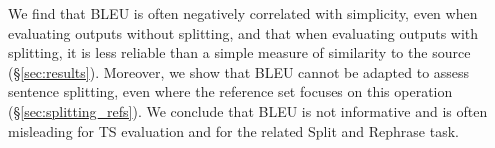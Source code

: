 \documentclass[11pt,a4paper]{article}
\begin{document}

We find that BLEU is often negatively correlated with simplicity, even
when evaluating outputs without splitting, and that when evaluating outputs with splitting,
it is less reliable than a simple measure of similarity to the source (\S\ref{sec:results}).
Moreover, we show that BLEU cannot be adapted to assess sentence splitting,
even where the reference set focuses on this operation (\S\ref{sec:splitting_refs}).
We conclude that BLEU is not informative and is often misleading for TS evaluation and for the related Split and Rephrase task.%








\end{document}
